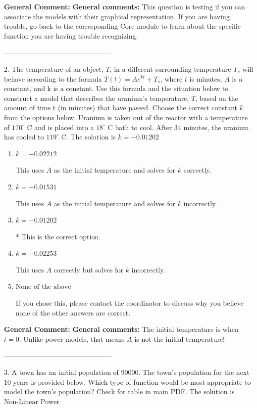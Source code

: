 \documentclass{extbook}[14pt]
\begin{document}
\textbf{General Comment:} \textbf{General comments:} This question is testing if you can associate the models with their graphical representation. If you are having trouble, go back to the corresponding Core module to learn about the specific function you are having trouble recognizing. 

-----------------------------------------------

2. The temperature of an object, $T$, in a different surrounding temperature $T_s$ will behave according to the formula $T(t) = Ae^{kt} + T_s$, where $t$ is minutes, $A$ is a constant, and k is a constant. Use this formula and the situation below to construct a model that describes the uranium's temperature, $T$, based on the amount of time t (in minutes) that have passed. Choose the correct constant $k$ from the options below.
Uranium is taken out of the reactor with a temperature of $170^{\circ}$ C and is placed into a $18^{\circ}$ C bath to cool. After 34 minutes, the uranium has cooled to $119^{\circ}$ C. 
The solution is $ k = -0.01202 $ 

\begin{enumerate}[label=\Alph*.] 
\item $ k = -0.02212 $ 

 This uses $A$ as the initial temperature and solves for $k$ correctly. 
\item $ k = -0.01531 $ 

 This uses $A$ as the initial temperature and solves for $k$ incorrectly. 
\item $ k = -0.01202 $ 

 * This is the correct option. 
\item $ k = -0.02253 $ 

 This uses $A$ correctly but solves for $k$ incorrectly. 
\item $ \text{None of the above} $ 

 If you chose this, please contact the coordinator to discuss why you believe none of the other answers are correct. 
\end{enumerate} 
 
\textbf{General Comment:} \textbf{General comments:} The initial temperature is when $t = 0$. Unlike power models, that means $A$ is not the initial temperature! 

-----------------------------------------------

3. A town has an initial population of 90000. The town's population for the next 10 years is provided below. Which type of function would be most appropriate to model the town's population?
Check for table in main PDF. 
The solution is $ \text{Non-Linear Power} $ 
\end{document}
